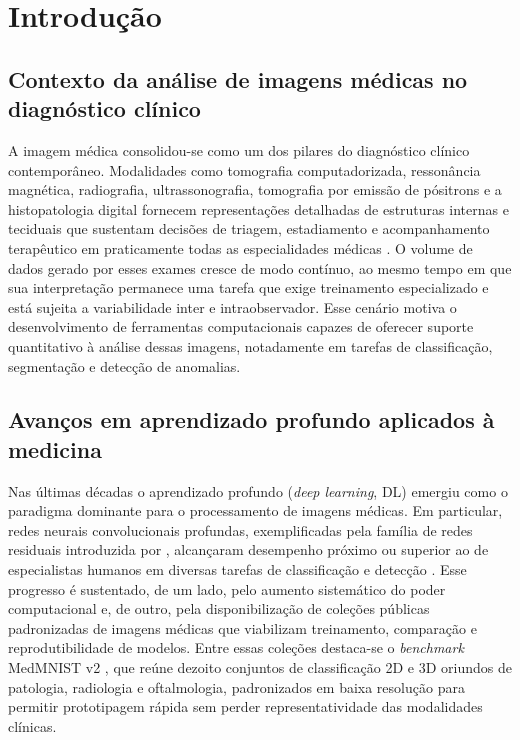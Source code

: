 
\chapter{Introdução}
\label{ch:introducao}


\section{Contexto da análise de imagens médicas no diagnóstico clínico}
\label{sec:intro-contexto}

A imagem médica consolidou-se como um dos pilares do diagnóstico clínico
contemporâneo. Modalidades como tomografia computadorizada, ressonância
magnética, radiografia, ultrassonografia, tomografia por emissão de pósitrons
e a histopatologia digital fornecem representações detalhadas de estruturas
internas e teciduais que sustentam decisões de triagem, estadiamento e
acompanhamento terapêutico em praticamente todas as especialidades médicas
\cite{jiang2023}. O volume de dados gerado por esses exames cresce de modo
contínuo, ao mesmo tempo em que sua interpretação permanece uma tarefa que
exige treinamento especializado e está sujeita a variabilidade inter e
intraobservador. Esse cenário motiva o desenvolvimento de ferramentas
computacionais capazes de oferecer suporte quantitativo à análise dessas
imagens, notadamente em tarefas de classificação, segmentação e detecção
de anomalias.

\section{Avanços em aprendizado profundo aplicados à medicina}
\label{sec:intro-dl}

Nas últimas décadas o aprendizado profundo (\emph{deep learning}, DL)
emergiu como o paradigma dominante para o processamento de imagens médicas.
Em particular, redes neurais convolucionais profundas, exemplificadas pela
família de redes residuais introduzida por , alcançaram
desempenho próximo ou superior ao de especialistas humanos em diversas
tarefas de classificação e detecção \cite{jiang2023}. Esse progresso é
sustentado, de um lado, pelo aumento sistemático do poder computacional e,
de outro, pela disponibilização de coleções públicas padronizadas de imagens
médicas que viabilizam treinamento, comparação e reprodutibilidade de
modelos. Entre essas coleções destaca-se o \emph{benchmark} MedMNIST v2
\cite{medmnist2023}, que reúne dezoito conjuntos de classificação 2D e 3D
oriundos de patologia, radiologia e oftalmologia, padronizados em baixa
resolução para permitir prototipagem rápida sem perder representatividade
das modalidades clínicas.

